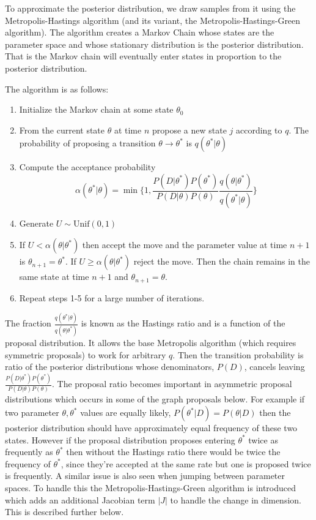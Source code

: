 \documentclass[11pt,a4paper]{article}
\begin{document}
To approximate the posterior distribution, we draw samples from it using
the Metropolis-Hastings algorithm (and its variant, the
Metropolis-Hastings-Green algorithm). The algorithm creates a Markov
Chain whose states are the parameter space and whose stationary
distribution is the posterior distribution. That is the Markov chain
will eventually enter states in proportion to the posterior
distribution.

The algorithm is as follows:

\begin{enumerate}
\def\labelenumi{\arabic{enumi}.}
\item
  Initialize the Markov chain at some state \(\theta_0\)
\item
  From the current state \(\theta\) at time \(n\) propose a new state
  \(j\) according to \(q\). The probability of proposing a transition
  \(\theta \rightarrow \theta^*\) is \(q(\theta^*|\theta)\)
\item
  Compute the acceptance probability
  \[\alpha(\theta^*|\theta) = \min\{1, \frac{P(D|\theta^*)P(\theta^*)}{P(D|\theta)P(\theta)}\frac{q(\theta|\theta^*)}{q(\theta^*|\theta)} \}\]
\item
  Generate \(U \sim \text{Unif}(0,1)\)
\item
  If \(U < \alpha(\theta|\theta^*)\) then accept the move and the
  parameter value at time \(n+1\) is \(\theta_{n+1} = \theta^*\). If
  \(U \geq \alpha(\theta|\theta^*)\) reject the move. Then the chain
  remains in the same state at time \(n+1\) and
  \(\theta_{n+1} = \theta\).
\item
  Repeat steps 1-5 for a large number of iterations.
\end{enumerate}

The fraction \(\frac{q(\theta^*|\theta)}{q(\theta|\theta^*)}\) is known
as the Hastings ratio and is a function of the proposal distribution. It
allows the base Metropolis algorithm (which requires symmetric
proposals) to work for arbitrary \(q\). Then the transition probability
is ratio of the posterior distributions whose denominators, \(P(D)\),
cancels leaving
\(\frac{P(D|\theta^*)P(\theta^*)}{P(D|\theta)P(\theta)}\). The proposal
ratio becomes important in asymmetric proposal distributions which
occurs in some of the graph proposals below. For example if two
parameter \(\theta, \theta^*\) values are equally likely,
\(P(\theta^*|D) = P(\theta|D)\) then the posterior distribution should
have approximately equal frequency of these two states. However if the
proposal distribution proposes entering \(\theta^*\) twice as frequently
as \(\theta^*\) then without the Hastings ratio there would be twice the
frequency of \(\theta^*\), since they're accepted at the same rate but
one is proposed twice is frequently. A similar issue is also seen when
jumping between parameter spaces. To handle this the
Metropolis-Hastings-Green algorithm is introduced which adds an
additional Jacobian term \(|J|\) to handle the change in dimension. This
is described further below.
\end{document}
